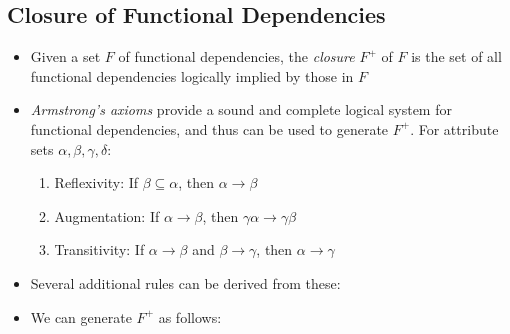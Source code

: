 \documentclass[a4paper]{article}
\begin{document}
\subsection{Closure of Functional Dependencies}
\begin{itemize}
\item Given a set $F$ of functional dependencies, the \emph{closure} $F^+$ of $F$ is the set of all functional dependencies logically implied by those in $F$
\item \emph{Armstrong's axioms} provide a sound and complete logical system for functional dependencies, and thus can be used to generate $F^+$. For attribute sets $\alpha,\beta,\gamma,\delta$:
\begin{enumerate}[label=(\roman*)]
\item Reflexivity: If $\beta\subseteq\alpha$, then $\alpha\rightarrow\beta$
\item Augmentation: If $\alpha\rightarrow\beta$, then $\gamma\alpha\rightarrow\gamma\beta$
\item Transitivity: If $\alpha\rightarrow\beta$ and $\beta\rightarrow\gamma$, then $\alpha\rightarrow\gamma$
\end{enumerate}
\item Several additional rules can be derived from these:
\item We can generate $F^+$ as follows:


\end{itemize}
\end{document}
